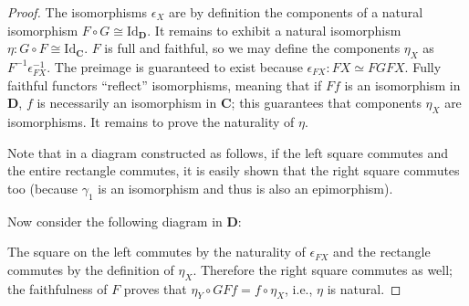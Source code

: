 \documentclass[a5paper,oneside,11pt]{article}
\newcommand\Id{\mathord{\mathrm{Id}}}
\newcommand\1{\mathord{\mathrm{1}}}
\newcommand\cat[1]{\mathbf{#1}}
\begin{document}
\begin{proof}
    The isomorphisms $\epsilon_X$ are by definition the components of a natural isomorphism
    $F \circ G \cong \Id_\cat{D}$.
    It remains to exhibit a natural isomorphism $\eta : G \circ F \cong \Id_\cat{C}$.
    $F$ is full and faithful, so we may define the components $\eta_X$ as $F^{-1}\epsilon^{-1}_{FX}$.
    The preimage is guaranteed to exist because $\epsilon_{FX} : FX \simeq FGFX$.
    Fully faithful functors ``reflect'' isomorphisms, meaning that if $Ff$ is an isomorphism
    in $\cat{D}$, $f$ is necessarily an isomorphism in $\cat{C}$; this guarantees that components
    $\eta_X$ are isomorphisms. It remains to prove the naturality of $\eta$.

    Note that in a diagram constructed as follows, if the left square commutes and the entire rectangle
    commutes, it is easily shown that the right square commutes too (because $\gamma_1$ is an
    isomorphism and thus is also an epimorphism).
    \begin{figure}[H]
    \centering
    \end{figure}
    Now consider the following diagram in $\cat{D}$:
    \begin{figure}[H]
        \centering
    \end{figure}
    The square on the left commutes by the naturality of $\epsilon_{FX}$ and the rectangle
    commutes by the definition of $\eta_X$. Therefore the right square commutes as
    well; the faithfulness of $F$ proves that $\eta_Y \circ GFf = f \circ \eta_X$,
    i.e., $\eta$ is natural.
\end{proof}
\end{document}
